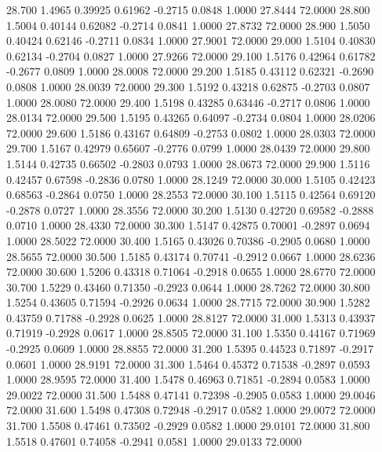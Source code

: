   28.700   1.4965   0.39925   0.61962  -0.2715   0.0848   1.0000  27.8444  72.0000
  28.800   1.5004   0.40144   0.62082  -0.2714   0.0841   1.0000  27.8732  72.0000
  28.900   1.5050   0.40424   0.62146  -0.2711   0.0834   1.0000  27.9001  72.0000
  29.000   1.5104   0.40830   0.62134  -0.2704   0.0827   1.0000  27.9266  72.0000
  29.100   1.5176   0.42964   0.61782  -0.2677   0.0809   1.0000  28.0008  72.0000
  29.200   1.5185   0.43112   0.62321  -0.2690   0.0808   1.0000  28.0039  72.0000
  29.300   1.5192   0.43218   0.62875  -0.2703   0.0807   1.0000  28.0080  72.0000
  29.400   1.5198   0.43285   0.63446  -0.2717   0.0806   1.0000  28.0134  72.0000
  29.500   1.5195   0.43265   0.64097  -0.2734   0.0804   1.0000  28.0206  72.0000
  29.600   1.5186   0.43167   0.64809  -0.2753   0.0802   1.0000  28.0303  72.0000
  29.700   1.5167   0.42979   0.65607  -0.2776   0.0799   1.0000  28.0439  72.0000
  29.800   1.5144   0.42735   0.66502  -0.2803   0.0793   1.0000  28.0673  72.0000
  29.900   1.5116   0.42457   0.67598  -0.2836   0.0780   1.0000  28.1249  72.0000
  30.000   1.5105   0.42423   0.68563  -0.2864   0.0750   1.0000  28.2553  72.0000
  30.100   1.5115   0.42564   0.69120  -0.2878   0.0727   1.0000  28.3556  72.0000
  30.200   1.5130   0.42720   0.69582  -0.2888   0.0710   1.0000  28.4330  72.0000
  30.300   1.5147   0.42875   0.70001  -0.2897   0.0694   1.0000  28.5022  72.0000
  30.400   1.5165   0.43026   0.70386  -0.2905   0.0680   1.0000  28.5655  72.0000
  30.500   1.5185   0.43174   0.70741  -0.2912   0.0667   1.0000  28.6236  72.0000
  30.600   1.5206   0.43318   0.71064  -0.2918   0.0655   1.0000  28.6770  72.0000
  30.700   1.5229   0.43460   0.71350  -0.2923   0.0644   1.0000  28.7262  72.0000
  30.800   1.5254   0.43605   0.71594  -0.2926   0.0634   1.0000  28.7715  72.0000
  30.900   1.5282   0.43759   0.71788  -0.2928   0.0625   1.0000  28.8127  72.0000
  31.000   1.5313   0.43937   0.71919  -0.2928   0.0617   1.0000  28.8505  72.0000
  31.100   1.5350   0.44167   0.71969  -0.2925   0.0609   1.0000  28.8855  72.0000
  31.200   1.5395   0.44523   0.71897  -0.2917   0.0601   1.0000  28.9191  72.0000
  31.300   1.5464   0.45372   0.71538  -0.2897   0.0593   1.0000  28.9595  72.0000
  31.400   1.5478   0.46963   0.71851  -0.2894   0.0583   1.0000  29.0022  72.0000
  31.500   1.5488   0.47141   0.72398  -0.2905   0.0583   1.0000  29.0046  72.0000
  31.600   1.5498   0.47308   0.72948  -0.2917   0.0582   1.0000  29.0072  72.0000
  31.700   1.5508   0.47461   0.73502  -0.2929   0.0582   1.0000  29.0101  72.0000
  31.800   1.5518   0.47601   0.74058  -0.2941   0.0581   1.0000  29.0133  72.0000
